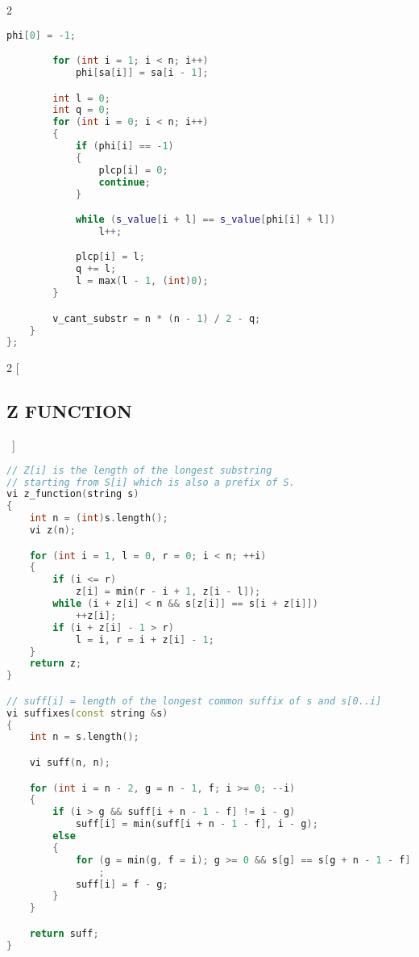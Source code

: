 \documentclass[leter]{amsart}
\begin{document}
\begin{multicols}{2}
\begin{lstlisting}[language=C++]
        phi[0] = -1;

        for (int i = 1; i < n; i++)
            phi[sa[i]] = sa[i - 1];

        int l = 0;
        int q = 0;
        for (int i = 0; i < n; i++)
        {
            if (phi[i] == -1)
            {
                plcp[i] = 0;
                continue;
            }

            while (s_value[i + l] == s_value[phi[i] + l])
                l++;

            plcp[i] = l;
            q += l;
            l = max(l - 1, (int)0);
        }

        v_cant_substr = n * (n - 1) / 2 - q;
    }
};

\end{lstlisting}
\end{multicols}
\begin{multicols}{2}
[\subsection{Z FUNCTION}\ ]
\begin{lstlisting}[language=C++]
// Z[i] is the length of the longest substring
// starting from S[i] which is also a prefix of S.
vi z_function(string s)
{
    int n = (int)s.length();
    vi z(n);

    for (int i = 1, l = 0, r = 0; i < n; ++i)
    {
        if (i <= r)
            z[i] = min(r - i + 1, z[i - l]);
        while (i + z[i] < n && s[z[i]] == s[i + z[i]])
            ++z[i];
        if (i + z[i] - 1 > r)
            l = i, r = i + z[i] - 1;
    }
    return z;
}

// suff[i] = length of the longest common suffix of s and s[0..i]
vi suffixes(const string &s)
{
    int n = s.length();

    vi suff(n, n);

    for (int i = n - 2, g = n - 1, f; i >= 0; --i)
    {
        if (i > g && suff[i + n - 1 - f] != i - g)
            suff[i] = min(suff[i + n - 1 - f], i - g);
        else
        {
            for (g = min(g, f = i); g >= 0 && s[g] == s[g + n - 1 - f]; --g)
                ;
            suff[i] = f - g;
        }
    }

    return suff;
}

\end{lstlisting}
\end{multicols}
\end{document}
